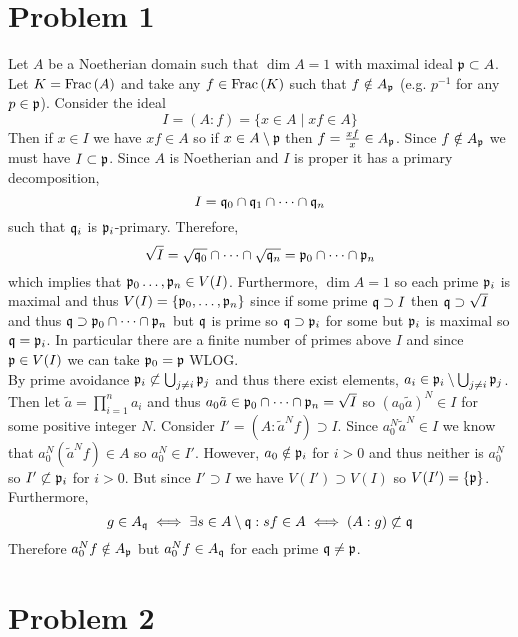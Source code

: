 \documentclass[12pt]{article}
\begin{document}
\renewcommand{\ev}[1]{\mathrm{ev}_{#1}}
\renewcommand{\tr}{\mathrm{tr}}
\renewcommand{\det}{\mathrm{det}}
\newcommand{\Endover}[2]{\mathrm{End}_{#1}\left(#2\right)}

\section{Problem 1}

Let $A$ be a Noetherian domain such that $\dim{A} = 1$ with maximal ideal $\mathfrak{p} \subset A$. Let $K = \mathrm{Frac}\left(A\right)$ and take any $f \in \mathrm{Frac}\left(K\right)$ such that $f \notin A_{\mathfrak{p}}$ (e.g. $p^{-1}$ for any $p \in \mathfrak{p}$). Consider the ideal
\[ I = (A : f) = \{ x \in A \mid x f \in A \} \]
Then if $x \in I$ we have $x f \in A$ so if $x \in A \setminus \mathfrak{p}$ then $f = \frac{xf}{x} \in A_{\mathfrak{p}}$. Since $f \notin A_{\mathfrak{p}}$ we must have $I \subset \mathfrak{p}$. Since $A$ is Noetherian and $I$ is proper it has a primary decomposition,
\[ I = \mathfrak{q}_0 \cap \mathfrak{q}_1 \cap \cdots \cap \mathfrak{q}_n \]
such that $\mathfrak{q}_i$ is $\mathfrak{p}_i$-primary. Therefore,
\[ \sqrt{I} = \sqrt{\mathfrak{q}_0} \cap \cdots \cap \sqrt{\mathfrak{q}_n} = \mathfrak{p}_0 \cap \cdots \cap \mathfrak{p}_n \]
which implies that $\mathfrak{p}_0 \dots, \mathfrak{p}_n \in V(I)$. Furthermore, $\dim{A} = 1$ so each prime $\mathfrak{p}_i$ is maximal and thus $V(I) = \{\mathfrak{p}_0, \dots, \mathfrak{p}_n \}$ since if some prime $\mathfrak{q} \supset I$ then $\mathfrak{q} \supset \sqrt{I}$ and thus $\mathfrak{q} \supset \mathfrak{p}_0 \cap \cdots \cap \mathfrak{p}_n$ but $\mathfrak{q}$ is prime so $\mathfrak{q} \supset \mathfrak{p}_i$ for some but $\mathfrak{p}_i$ is maximal so $\mathfrak{q} = \mathfrak{p}_i$. In particular there are a finite number of primes above $I$ and since $\mathfrak{p} \in V(I)$ we can take $\mathfrak{p}_0 = \mathfrak{p}$ WLOG. 
\bigskip\\
By prime avoidance $\mathfrak{p}_i \not\subset \bigcup_{j \neq i} \mathfrak{p}_j$ and thus there exist elements, $a_i \in \mathfrak{p}_i \setminus \bigcup_{j \neq i} \mathfrak{p}_j$. Then let $\tilde{a} = \prod_{i = 1}^n a_i$ and thus $a_0 \tilde{a} \in \mathfrak{p}_0 \cap \cdots \cap \mathfrak{p}_n = \sqrt{I}$ so $(a_0 \tilde{a})^N \in I$ for some positive integer $N$. Consider $I' = (A : \tilde{a}^N f) \supset I$. Since $a_0^N \tilde{a}^N \in I$ we know that $a_0^N (\tilde{a}^N f) \in A$ so $a_0^N \in I'$. However, $a_0 \notin \mathfrak{p}_i$ for $i > 0$ and thus neither is $a_0^N$ so $I' \not\subset \mathfrak{p}_i$ for $i > 0$. But since $I' \supset I$ we have $V(I') \supset V(I)$ so $V(I') = \{ \mathfrak{p} \}$. Furthermore, 
\[ g \in A_{\mathfrak{q}} \iff \exists s \in A \setminus \mathfrak{q} : s f \in A \iff (A : g) \not\subset \mathfrak{q} \] 
Therefore $a_0^N f \notin A_{\mathfrak{p}}$ but $a_0^N f \in A_{\mathfrak{q}}$ for each prime $\mathfrak{q} \neq \mathfrak{p}$.  

\section{Problem 2}
\end{document}
